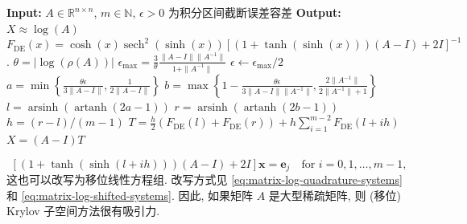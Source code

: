 \begin{algorithm}[H]\caption{{基于 DE 公式计算 $\log(A)$}}\label{alg:matrix-log-de}\begin{algorithmic}[1]
\State \textbf{Input:} $A\in\mathbb{R}^{n\times n}$, $m\in\mathbb{N}$, {$\epsilon>0$ 为积分区间截断误差容差}
\State \textbf{Output:} $X\approx\log(A)$
 $F_{\mathrm{DE}}(x)=\cosh(x)\operatorname{sech}^2(\sinh(x))[(1+\tanh(\sinh(x)))(A-I)+2I]^{-1}$.
\State $\theta=|\log(\rho(A))|$
\State $\epsilon_{\max}=\frac{3}{\theta}\frac{\|A-I\|\|A^{-1}\|}{1+\|A^{-1}\|}$
\If{$\epsilon\ge\epsilon_{\max}$}
\State $\epsilon\leftarrow\epsilon_{\max}/2$
\EndIf
\State $a=\min\left\{\frac{\theta\epsilon}{3\|A-I\|},\frac{1}{2\|A-I\|}\right\}$
\State $b=\max\left\{1-\frac{\theta\epsilon}{3\|A-I\|\|A^{-1}\|},\frac{2\|A^{-1}\|}{2\|A^{-1}\|+1}\right\}$
\State $l=\operatorname{arsinh}(\operatorname{artanh}(2a-1))$
\State $r=\operatorname{arsinh}(\operatorname{artanh}(2b-1))$
\State $h=(r-l)/(m-1)$
\State $T=\frac{h}{2}(F_{\mathrm{DE}}(l)+F_{\mathrm{DE}}(r))+h\sum_{i=1}^{m-2}F_{\mathrm{DE}}(l+ih)$
\State $X=(A-I)T$
\end{algorithmic}\end{algorithm}

\[[(1+\tanh(\sinh(l+ih)))(A-I)+2I]\boldsymbol{x}=\boldsymbol{e}_j\quad\text{for }i=0,1,\ldots,m-1,\]
{这也可以改写为移位线性方程组. 改写方式见 \eqref{eq:matrix-log-quadrature-systems} 和 \eqref{eq:matrix-log-shifted-systems}. 因此, 如果矩阵 $A$ 是大型稀疏矩阵, 则 (移位) Krylov 子空间方法很有吸引力.}
